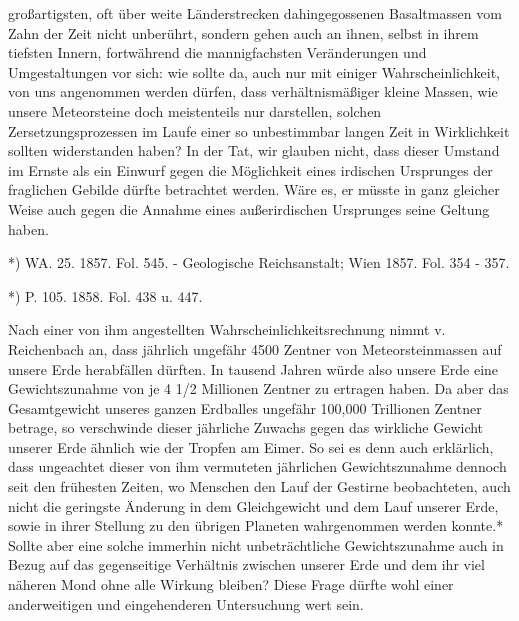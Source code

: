 \documentclass[a4paper, 11pt, oneside, polutonikogreek, german]{article}
\begin{document}
großartigsten, oft über weite Länderstrecken dahingegossenen Basaltmassen vom Zahn der Zeit nicht unberührt, sondern gehen auch an ihnen, selbst in ihrem tiefsten Innern, fortwährend die mannigfachsten Veränderungen und Umgestaltungen vor sich: wie sollte da, auch nur mit einiger Wahrscheinlichkeit, von uns angenommen werden dürfen, dass verhältnismäßiger kleine Massen, wie unsere Meteorsteine doch meistenteils nur darstellen, solchen Zersetzungsprozessen im Laufe einer so unbestimmbar langen Zeit in Wirklichkeit sollten widerstanden haben? In der Tat, wir glauben nicht, dass dieser Umstand im Ernste als ein Einwurf gegen die Möglichkeit eines irdischen Ursprunges der fraglichen Gebilde dürfte betrachtet werden. Wäre es, er müsste in ganz gleicher Weise auch gegen die Annahme eines außerirdischen Ursprunges seine Geltung haben.

*) WA. 25. 1857. Fol. 545. - Geologische Reichsanstalt; Wien 1857. Fol. 354 - 357.

*) P. 105. 1858. Fol. 438 u. 447.

Nach einer von ihm angestellten Wahrscheinlichkeitsrechnung nimmt v. Reichenbach an, dass jährlich ungefähr 4500 Zentner von Meteorsteinmassen auf unsere Erde herabfällen dürften. In tausend Jahren würde also unsere Erde eine Gewichtszunahme von je 4 1/2 Millionen Zentner zu ertragen haben. Da aber das Gesamtgewicht unseres ganzen Erdballes ungefähr 100,000 Trillionen Zentner betrage, so verschwinde dieser jährliche Zuwachs gegen das wirkliche Gewicht unserer Erde ähnlich wie der Tropfen am Eimer. So sei es denn auch erklärlich, dass ungeachtet dieser von ihm vermuteten jährlichen Gewichtszunahme dennoch seit den frühesten Zeiten, wo Menschen den Lauf der Gestirne beobachteten, auch nicht die geringste Änderung in dem Gleichgewicht und dem Lauf unserer Erde, sowie in ihrer Stellung zu den übrigen Planeten wahrgenommen werden konnte.* Sollte aber eine solche immerhin nicht unbeträchtliche Gewichtszunahme auch in Bezug auf das gegenseitige Verhältnis zwischen unserer Erde und dem ihr viel näheren Mond ohne alle Wirkung bleiben? Diese Frage dürfte wohl einer anderweitigen und eingehenderen Untersuchung wert sein.
\end{document}
